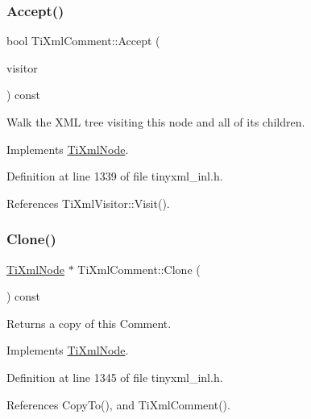 \subsubsection{\texorpdfstring{Accept()}{Accept()}}
{\footnotesize\ttfamily bool Ti\+Xml\+Comment\+::\+Accept (\begin{DoxyParamCaption}\item[{\hyperlink{class_ti_xml_visitor}{Ti\+Xml\+Visitor} $\ast$}]{visitor }\end{DoxyParamCaption}) const\hspace{0.3cm}{\ttfamily [virtual]}}

Walk the X\+ML tree visiting this node and all of its children. 

Implements \hyperlink{class_ti_xml_node_acc0f88b7462c6cb73809d410a4f5bb86}{Ti\+Xml\+Node}.



Definition at line 1339 of file tinyxml\+\_\+inl.\+h.



References Ti\+Xml\+Visitor\+::\+Visit().

\hypertarget{class_ti_xml_comment_a1f9f06e2ed3f77875093436193b16c16}{}\label{class_ti_xml_comment_a1f9f06e2ed3f77875093436193b16c16} 
\subsubsection{\texorpdfstring{Clone()}{Clone()}}
{\footnotesize\ttfamily \hyperlink{class_ti_xml_node}{Ti\+Xml\+Node} $\ast$ Ti\+Xml\+Comment\+::\+Clone (\begin{DoxyParamCaption}{ }\end{DoxyParamCaption}) const\hspace{0.3cm}{\ttfamily [virtual]}}



Returns a copy of this Comment. 



Implements \hyperlink{class_ti_xml_node_a4508cc3a2d7a98e96a54cc09c37a78a4}{Ti\+Xml\+Node}.



Definition at line 1345 of file tinyxml\+\_\+inl.\+h.



References Copy\+To(), and Ti\+Xml\+Comment().

\hypertarget{class_ti_xml_comment_aaeb8a0b2d503f603879a2d04ceb54295}{}\label{class_ti_xml_comment_aaeb8a0b2d503f603879a2d04ceb54295} 

